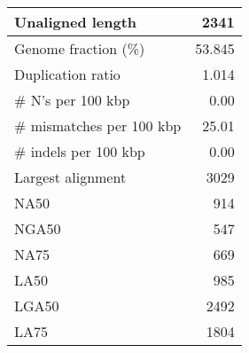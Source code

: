 \documentclass[12pt,a4paper]{article}
\begin{document}
\begin{table}[ht]
\begin{center}
\begin{tabular}{|l*{1}{|r}|}
Unaligned length & 2341 \\ \hline
Genome fraction (\%) & 53.845 \\ \hline
Duplication ratio & 1.014 \\ \hline
\# N's per 100 kbp & 0.00 \\ \hline
\# mismatches per 100 kbp & 25.01 \\ \hline
\# indels per 100 kbp & 0.00 \\ \hline
Largest alignment & 3029 \\ \hline
NA50 & 914 \\ \hline
NGA50 & 547 \\ \hline
NA75 & 669 \\ \hline
LA50 & 985 \\ \hline
LGA50 & 2492 \\ \hline
LA75 & 1804 \\ \hline
\end{tabular}
\end{center}
\end{table}
\end{document}
